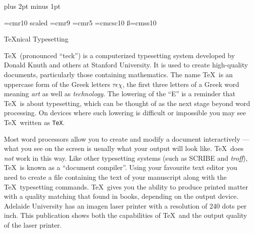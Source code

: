 
\hsize 6.3in                           %
\vsize 9.7in                           %

\parskip 8pt plus 2pt minus 1pt        %

\font\bigrm=cmr10 scaled      %
\font\ninerm=cmr9                      %
\font\fiverm=cmr5                      %
\font\sm=cmcsc10                       %
\font\ss=cmss10                        %

\def\subhead#1{\bigskip                %
               \noindent{\bf #1}\par   %
               \nobreak}               %

\centerline{\bigrm \TeX nical Typesetting}

\vskip 2.5cm                           %

\subhead{What is \TeX?}

\TeX\ (pronounced ``teck'') is a computerized typesetting system developed by
Donald Knuth and others at Stanford University.  It is used to create
high-quality documents, particularly those containing mathematics.
The name \TeX\ is an uppercase form of the Greek letters $\tau\epsilon\chi$,
the first three letters of a Greek word meaning {\sl art} as well as
{\sl technology}.
The lowering of the ``E'' is a reminder that \TeX\ is about typesetting,
which can be thought of as the next stage beyond word processing.
On devices where such lowering is difficult or impossible you may see \TeX\
written as {\tt TeX}.


Most word processors allow you to
create and modify a document interactively --- what
you see on the screen is usually what your output will look like.
\TeX\ does {\it not} work in this way.
Like other typesetting systems (such as SCRIBE and
{\sl troff\/}), \TeX\ is known as a ``document compiler''.  Using your
favourite text editor you need to create a file containing the
text of your manuscript along with the \TeX\ typesetting commands.
\TeX\ gives you the ability to produce printed matter with a quality
matching that found in books, depending on the output device.
Adelaide University has an {\sm imagen} laser printer
with a resolution of 240 dots per inch.
This publication shows both the capabilities of \TeX\ and
the output quality of the laser printer.

